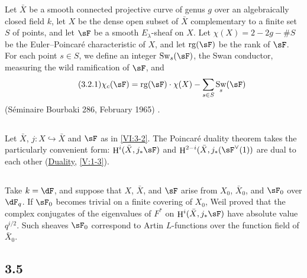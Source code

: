 \documentclass[oneside]{book}
\DeclareMathOperator{\h}{H}
\DeclareMathOperator{\swan}{Sw}
\newcounter{char}
\theoremstyle{sga-source}
\theoremstyle{sga-source-dash}
\theoremstyle{sga-source-dotdash}
\theoremstyle{sga-source-number-note-dash}
\theoremstyle{sga-source-note-number-dotdash}
\theoremstyle{sga-source-example-dotdash}
\theoremstyle{sga-source-inline-number}
\theoremstyle{sga-source-bare-number}
\theoremstyle{sga-source}
\newcommand{\PrintPage}[1]{}\newcommand{\MathPage}[1]{}\newcommand{\PrintCite}[2]{#1}\newcommand{\var}[3]{#1}
\begin{document}
Let $\bar X$ be a smooth connected projective curve of genus $g$ over an 
algebraically closed field $k$, let $X$ be the dense open subset of $\bar X$ 
complementary to a finite set $S$ of points, and let $\sF$ be a 
smooth $E_\lambda$-sheaf on $X$. Let $\chi(X)=2-2 g-\# S$ be the 
Euler--Poincaré characteristic of $X$, and let $\operatorname{rg}(\sF)$ be the 
rank of $\sF$. For each point $s\in S$, we define an integer 
$\swan_s(\sF)$, the Swan conductor, measuring the wild ramification of 
$\sF$, and 
\begin{align*}\tag{3.2.1}\label{VI:eq:3-2-1}
  \chi_c(\sF) = \operatorname{rg}(\sF) \cdot \chi(X) - \sum_{s\in S} \swan_s(\sF) 
\end{align*}
(Séminaire Bourbaki 286, February 1965) \cite{ra65}. 





\subsection{}\label{VI:3-3}

Let $\bar X$, $j:X\hookrightarrow\bar X$ and $\sF$ as in \ref{VI:3-2}. The 
Poincaré duality theorem takes the particularly convenient form: 
$\h^i(\bar X,j_\ast \sF)$ and $\var{\h^{2-i}(\bar X,j_\ast(\sF^\vee(1))}{\h^{2-i}(\bar X,j_\ast(\sF^\vee(1)))}{S45-SOL-0757}$ are 
dual to each other (\hyperref[V]{Duality}, \ref{V:1-3}). 





\PrintPage{190}
\subsection{}\label{VI:3-4}

Take $k=\dF$, and suppose that $X$, $\bar X$, and $\sF$ arise from 
$X_0$, $\bar X_0$, and $\sF_0$ over $\dF_q$. If $\sF_0$ becomes trivial on a 
finite covering of $X_0$, Weil proved that the complex conjugates of 
the eigenvalues of $F^\ast$ on $\h^i(\bar X,j_\ast\sF)$ have absolute value 
$q^{i/2}$. Such sheaves $\sF_0$ correspond to Artin $L$-functions 
over the function field of $\bar X_0$. 





\subsection*{3.5}\label{VI:3-5_} %
\end{document}
